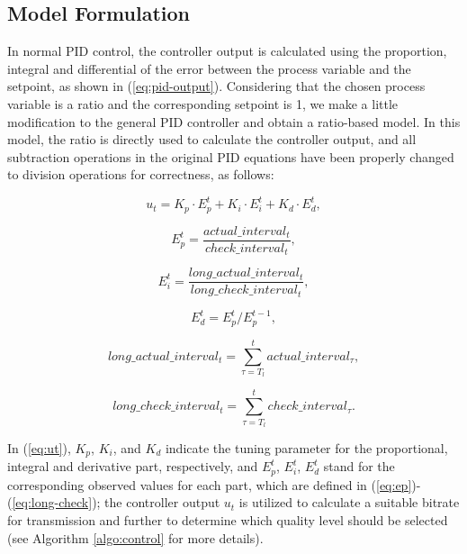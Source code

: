\documentclass[journal,draftclsnofoot,onecolumn]{IEEEtran}
\begin{document}
\subsection{Model Formulation}
\label{subsec:model-formulation}

In normal PID control, the controller output is calculated using the proportion, integral and differential of the error between the process variable and the setpoint, as shown in (\ref{eq:pid-output}). Considering that the chosen process variable is a ratio and the corresponding setpoint is 1, we make a little modification to the general PID controller and obtain a ratio-based model. In this model, the ratio is directly used to calculate the controller output, and all subtraction operations in the original PID equations have been properly changed to division operations for correctness, as follows:

\begin{equation}
\label{eq:ut}
{u_t} = {K_p} \cdot E_p^t + {K_i} \cdot E_i^t + {K_d} \cdot E_d^t ,
\end{equation}

\begin{equation}
\label{eq:ep}
E_p^t = \frac{{actual\_interva{l_t}}}{{check\_interva{l_t}}} ,
\end{equation}

\begin{equation}
\label{eq:ei}
E_i^t = \frac{{long\_actual\_interva{l_t}}}{{long\_check\_interva{l_t}}} ,
\end{equation}

\begin{equation}
\label{eq:ed}
E_d^t = E_p^t/E_p^{t - 1} ,
\end{equation}

\begin{equation}
\label{eq:long-actual}
long\_actual\_interva{l_t} = \sum\limits_{\tau = {T_l}}^t {actual\_interva{l_\tau}} ,
\end{equation}

\begin{equation}
\label{eq:long-check}
long\_check\_interva{l_t} = \sum\limits_{\tau = {T_l}}^t {check\_interva{l_\tau}} .
\end{equation}


In (\ref{eq:ut}), $K_p$, $K_i$, and $K_d$ indicate the tuning parameter for the proportional, integral and derivative part, respectively, and $E_p^t$, $E_i^t$, $E_d^t$ stand for the corresponding observed values for each part, which are defined in (\ref{eq:ep})-(\ref{eq:long-check}); the controller output $u_t$ is utilized to calculate a suitable bitrate for transmission and further to determine which quality level should be selected (see Algorithm \ref{algo:control} for more details).
\end{document}
